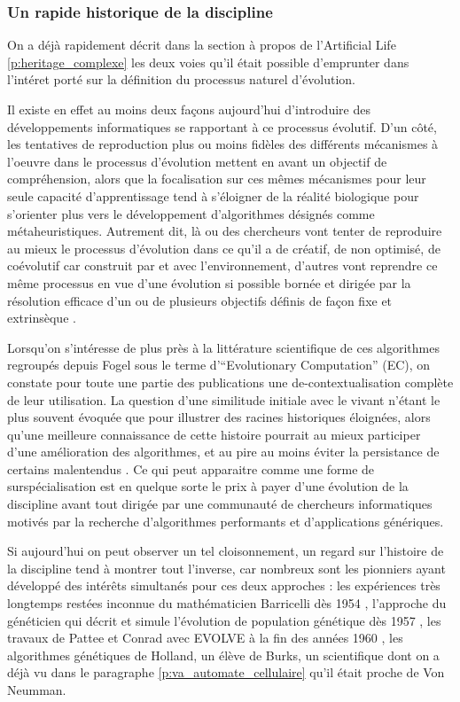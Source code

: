 \subsubsection{Un rapide historique de la discipline}
\label{sssec:historique_EA}

On a déjà rapidement décrit dans la section à propos de l'Artificial Life \ref{p:heritage_complexe} les deux voies qu'il était possible d'emprunter dans l'intéret porté sur la définition du processus naturel d'évolution.

Il existe en effet au moins deux façons aujourd'hui d'introduire des développements informatiques se rapportant à ce processus évolutif. D'un côté, les tentatives de reproduction plus ou moins fidèles des différents mécanismes à l'oeuvre dans le processus d'évolution mettent en avant un objectif de compréhension, alors que la focalisation sur ces mêmes mécanismes pour leur seule capacité d'apprentissage tend à s'éloigner de la réalité biologique pour s'orienter plus vers le développement d'algorithmes désignés comme métaheuristiques. Autrement dit, là ou des chercheurs vont tenter de reproduire au mieux le processus d'évolution dans ce qu'il a de créatif, de non optimisé, de coévolutif car construit par  et avec l'environnement, d'autres vont reprendre ce même processus en vue d'une évolution si possible bornée et dirigée par la résolution efficace d'un ou de plusieurs objectifs définis de façon fixe et extrinsèque \autocites{Taylor2001, Taylor2012}.

Lorsqu'on s'intéresse de plus près à la littérature scientifique de ces algorithmes regroupés depuis Fogel sous le terme d'\foreignquote{english}{Evolutionary Computation} (EC), on constate pour toute une partie des publications une de-contextualisation complète de leur utilisation. La question d'une similitude initiale avec le vivant n'étant le plus souvent évoquée que pour illustrer des racines historiques éloignées, alors qu'une meilleure connaissance de cette histoire pourrait au mieux participer d'une amélioration des algorithmes, et au pire au moins éviter la persistance de certains malentendus \autocite{DeJong1993a}. Ce qui peut apparaitre comme une forme de surspécialisation est en quelque sorte le prix à payer d'une évolution de la discipline avant tout dirigée par une communauté de chercheurs informatiques motivés par la recherche d'algorithmes performants et d'applications génériques.

Si aujourd'hui on peut observer un tel cloisonnement, un regard sur l'histoire de la discipline tend à montrer tout l'inverse, car nombreux sont les pionniers ayant développé des intérêts simultanés pour ces deux approches : les expériences très longtemps restées inconnue du mathématicien Barricelli dès 1954 , l'approche du généticien \textcite{Fraser1957} qui décrit et simule l'évolution de population génétique dès 1957 , les travaux de Pattee et Conrad avec EVOLVE à la fin des années 1960 \autocite{Conrad1970}, les algorithmes génétiques  de Holland, un élève de Burks, un scientifique dont on a déjà vu dans le paragraphe \ref{p:va_automate_cellulaire} qu'il était proche de Von Neumman.

